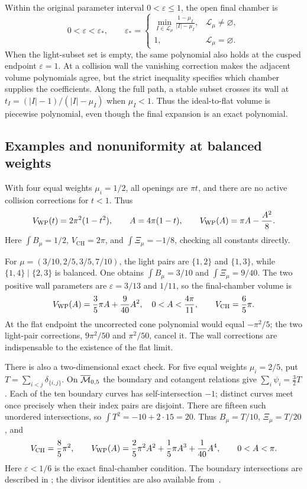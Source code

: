 Within the original parameter interval $0<\varepsilon\le1$, the
open final chamber is
\begin{equation}
 0<\varepsilon<\varepsilon_*,\qquad
 \varepsilon_*=
 \begin{cases}
 \displaystyle\min_{I\in\mathcal L_\mu}
                \frac{1-\mu_I}{|I|-\mu_I},&\mathcal L_\mu\ne\varnothing,\\
 1,&\mathcal L_\mu=\varnothing.
 \end{cases}
 \label{eq:finalchamberwidth}
\end{equation}
When the light-subset set is empty, the same polynomial also holds
at the cusped endpoint $\varepsilon=1$. At a collision wall the
vanishing correction makes the adjacent volume polynomials agree,
but the strict inequality specifies which chamber supplies the
coefficients. Along the full
path, a stable subset crosses its wall at
$t_I=(|I|-1)/(|I|-\mu_I)$ when $\mu_I<1$. Thus the ideal-to-flat
volume is piecewise polynomial, even though the final expansion is
an exact polynomial.

\subsection{Examples and nonuniformity at balanced weights}

With four equal weights $\mu_i=1/2$, all openings are $\pi t$, and
there are no active collision corrections for $t<1$. Thus
\begin{equation}
 V_{\mathrm{WP}}(t)=2\pi^2(1-t^2),\qquad A=4\pi(1-t),\qquad
 V_{\mathrm{WP}}(A)=\pi A-\frac{A^2}{8}.
 \label{eq:equalflatvolume}
\end{equation}
Here $\int B_\mu=1/2$, $V_{\mathrm{CH}}=2\pi$, and
$\int\Xi_\mu=-1/8$, checking all constants directly.

For $\mu=(3/10,2/5,3/5,7/10)$, the light pairs are $\{1,2\}$
and $\{1,3\}$, while $\{1,4\}\mid\{2,3\}$ is balanced.
One obtains $\int B_\mu=3/10$ and $\int\Xi_\mu=9/40$.
The two positive wall parameters are $\varepsilon=3/13$ and $1/11$,
so the final-chamber volume is
\[
 V_{\mathrm{WP}}(A)=\frac35\pi A+\frac9{40}A^2,
 \quad 0<A<\frac{4\pi}{11},\qquad
 V_{\mathrm{CH}}=\frac65\pi.
\]
At the flat endpoint the uncorrected cone polynomial would equal
$-\pi^2/5$; the two light-pair corrections, $9\pi^2/50$ and
$\pi^2/50$, cancel it. The wall corrections are indispensable to
the existence of the flat limit.

There is also a two-dimensional exact check. For five equal weights
$\mu_i=2/5$, put $T=\sum_{i<j}\delta_{\{i,j\}}$. On
$\overline{\mathcal M}_{0,5}$ the boundary and cotangent relations give
$\sum_i\psi_i=\tfrac32T$. Each of the ten boundary curves has
self-intersection $-1$; distinct curves meet once precisely when
their index pairs are disjoint. There are fifteen such unordered
intersections, so $\int T^2=-10+2\cdot15=20$.
Thus $B_\mu=T/10$, $\Xi_\mu=T/20$, and
\[
 V_{\mathrm{CH}}=\frac85\pi^2,\qquad
 V_{\mathrm{WP}}(A)=\frac25\pi^2A^2+\frac15\pi A^3+\frac1{40}A^4,
 \qquad 0<A<\pi.
\]
Here $\varepsilon<1/6$ is the exact final-chamber condition.
The boundary intersections are described in
\cite[Example 2.2 and Section 5]{Kojima}; the divisor identities are
also available from~\cite[Section 7.3 and Appendix A]{KoziarzNguyen}.

